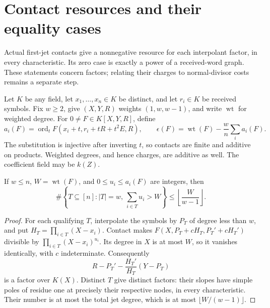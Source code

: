 \section{Contact resources and their equality cases}
\label{app:primary-contact-resource}

Actual first-jet contacts give a nonnegative resource for each
interpolant factor, in every characteristic. Its zero case is exactly
a power of a received-word graph. These statements concern factors;
relating their charges to normal-divisor costs remains a separate step.

Let $K$ be any field, let $x_1,\ldots,x_n\in K$ be distinct, and let
$r_i\in K$ be received symbols. Fix $w\ge2$, give $(X,Y,R)$ weights
$(1,w,w-1)$, and write $\operatorname{wt}$ for weighted degree.
For $0\ne F\in K[X,Y,R]$, define
\[
 a_i(F)=\operatorname{ord}_t F(x_i+t,r_i+tR+t^2E,R),\qquad
 \epsilon(F)=\operatorname{wt}(F)-\frac wn\sum_i a_i(F).
\]
The substitution is injective after inverting $t$, so contacts are
finite and additive on products. Weighted degrees, and hence charges,
are additive as well. The coefficient field may be $k(Z)$.

\begin{lemma}
\label{lem:contact-subset-average}
If $w\le n$, $W=\operatorname{wt}(F)$, and $0\le u_i\le a_i(F)$ are
integers, then
\begin{equation}
 \#\left\{T\subseteq[n]:|T|=w,\ \sum_{i\in T}u_i>W\right\}
 \le\left\lfloor\frac W{w-1}\right\rfloor.
 \label{eq:contact-subset-bound}
\end{equation}
\end{lemma}
\begin{proof}
For each qualifying $T$, interpolate the symbols by $P_T$ of degree
less than $w$, and put $H_T=\prod_{i\in T}(X-x_i)$.
Contact makes $F(X,P_T+cH_T,P_T'+cH_T')$ divisible by
$\prod_{i\in T}(X-x_i)^{u_i}$. Its degree in $X$ is at most $W$, so it
vanishes identically, with $c$ indeterminate. Consequently
\[
 R-P_T'-\frac{H_T'}{H_T}(Y-P_T)
\]
is a factor over $K(X)$. Distinct $T$ give distinct factors: their
slopes have simple poles of residue one at precisely their respective
nodes, in every characteristic. Their number is at most the total
jet degree, which is at most $\lfloor W/(w-1)\rfloor$.
\end{proof}

